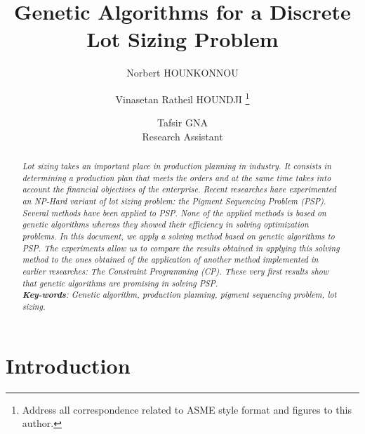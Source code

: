 \documentclass[twocolumn,10pt]{asme2ej}
\title{Genetic Algorithms for a Discrete Lot Sizing Problem}
\author{Norbert HOUNKONNOU
    \affiliation{
	University of Abomey-Calavi\\
    }	
}
\author{Vinasetan Ratheil HOUNDJI
\thanks{Address all correspondence related to ASME style format and figures to this author.} 
    \affiliation{
    University of Abomey-Calavi
    }
}
\author{Tafsir GNA\\
        Research Assistant\\
}
\begin{document}
\maketitle    

\begin{abstract}
{\it Lot sizing takes an important place in production planning in industry. It consists
in determining a production plan that meets the orders and at the same time takes
into account the financial objectives of the enterprise. Recent researches have experimented an NP-Hard variant of lot sizing problem: the Pigment Sequencing Problem
(PSP). Several methods have been applied to PSP. None of the applied methods is
based on genetic algorithms whereas they showed their efficiency in solving optimization problems. In this document, we apply a solving method based on genetic algorithms to PSP.
The experiments allow us to compare the results obtained in applying this
solving method to the ones obtained of the application of another method implemented in
earlier researches: The Constraint Programming (CP). These very first results show that genetic algorithms are promising in solving PSP. \\
\textbf{Key-words}: Genetic algorithm, production planning, pigment sequencing problem, lot
sizing.
}
\end{abstract}

\section{Introduction}
\end{document}
